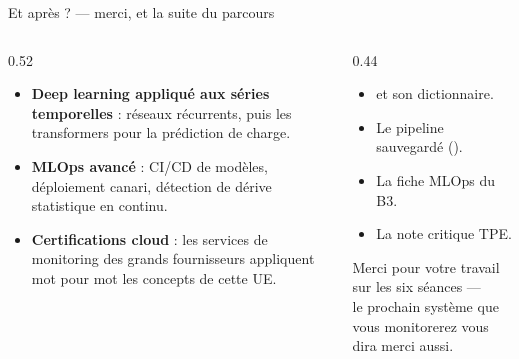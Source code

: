 \begin{frame}{Et après ? --- merci, et la suite du parcours}
\footnotesize%
\begin{columns}[t]
\begin{column}{0.52\textwidth}
\begin{kbox}
\begin{itemize}
\item \textbf{Deep learning appliqué aux séries temporelles} : réseaux
récurrents, puis les transformers pour la prédiction de charge.
\item \textbf{MLOps avancé} : CI/CD de modèles, déploiement canari,
détection de dérive statistique en continu.
\item \textbf{Certifications cloud} : les services de monitoring des grands
fournisseurs appliquent mot pour mot les concepts de cette UE.
\end{itemize}
\end{kbox}
\end{column}
\begin{column}{0.44\textwidth}
\begin{ebox}
\begin{itemize}
\item {} et son dictionnaire.
\item Le pipeline sauvegardé ().
\item La fiche MLOps du B3.
\item La note critique TPE.
\end{itemize}
\end{ebox}
\begin{center}\small
Merci pour votre travail sur les six séances ---\\
le prochain système que vous monitorerez vous dira merci aussi.
\end{center}
\end{column}
\end{columns}
\end{frame}
